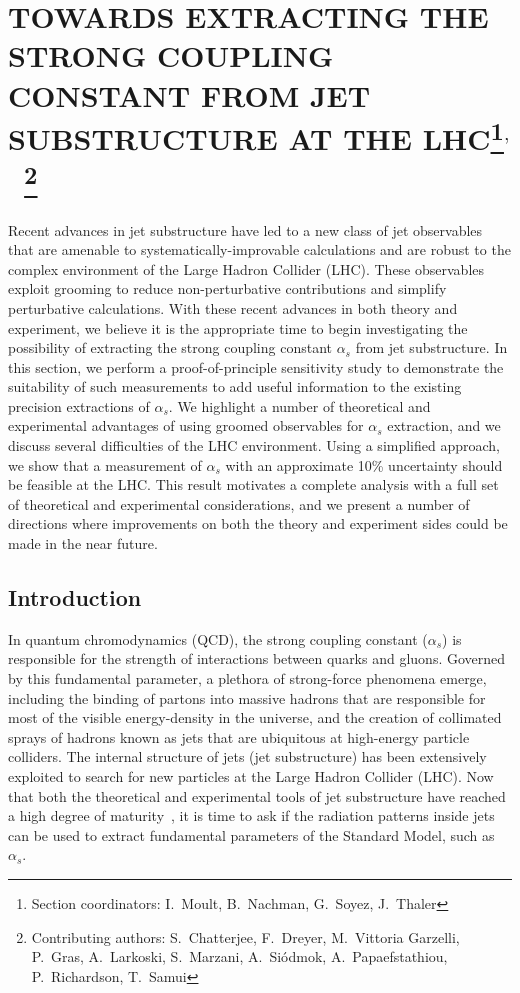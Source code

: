 \documentclass[11pt]{cernrep}
\begin{document}
\section{TOWARDS EXTRACTING THE STRONG COUPLING CONSTANT FROM JET SUBSTRUCTURE AT THE LHC\protect\footnote{Section coordinators:  I.~Moult, B.~Nachman, G.~Soyez, J.~Thaler}$^{,}$~\protect\footnote{Contributing authors: S.~Chatterjee, F.~Dreyer, M.~Vittoria Garzelli, P.~Gras, A.~Larkoski, S.~Marzani, A.~Si\'{o}dmok, A.~Papaefstathiou, P.~Richardson, T.~Samui}}

Recent advances in jet substructure have led to a new class of jet observables that are amenable to systematically-improvable calculations and are robust to the complex environment of the Large Hadron Collider (LHC).
%
These observables exploit grooming to reduce non-perturbative contributions and simplify perturbative calculations.
%
With these recent advances in both theory and experiment, we believe it is the appropriate time to begin investigating the possibility of extracting the strong coupling constant $\alpha_s$ from jet substructure.
%
In this section, we perform a proof-of-principle sensitivity study to demonstrate the suitability of such measurements to add useful information to the existing precision extractions of $\alpha_s$.
%
We highlight a number of theoretical and experimental advantages of using groomed observables for $\alpha_s$ extraction, and we discuss several difficulties of the LHC environment.
%
Using a simplified approach, we show that a measurement of $\alpha_s$ with an approximate 10\% uncertainty should be feasible at the LHC.
%
This result motivates a complete analysis with a full set of theoretical and experimental considerations, and we present a number of directions where improvements on both the theory and experiment sides could be made in the near future.

\subsection{Introduction}

In quantum chromodynamics (QCD), the strong coupling constant ($\alpha_s$) is responsible for the strength of interactions between quarks and gluons.
%
Governed by this fundamental parameter, a plethora of strong-force phenomena emerge, including the binding of partons into massive hadrons that are responsible for most of the visible energy-density in the universe, and the creation of collimated sprays of hadrons known as jets that are ubiquitous at high-energy particle colliders.
%
The internal structure of jets (jet substructure) has been extensively exploited to search for new particles at the Large Hadron Collider (LHC).
%
Now that both the theoretical and experimental tools of jet substructure have reached a high degree of maturity~\cite{Abdesselam:2010pt,Altheimer:2012mn,Altheimer:2013yza,Adams:2015hiv,Larkoski:2017jix}, it is time to ask if the radiation patterns inside jets can be used to extract fundamental parameters of the Standard Model, such as $\alpha_s$.
\end{document}
